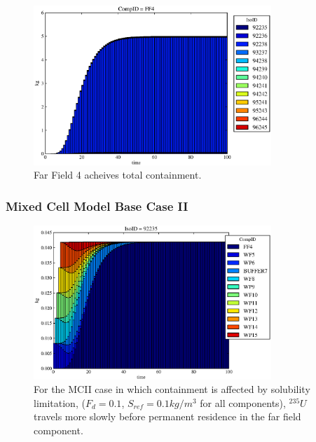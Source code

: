 \begin{frame}[ctb!]
\begin{figure}
\begin{minipage}[b]{0.45\linewidth}
  \includegraphics[width=0.8\textwidth]{./images/mcIII0.eps}
  \caption[Case MCI WP Contaminants.]{ 
    Far Field 4 acheives total containment.
    }
  \label{fig:mcII}


  \end{minipage}
\end{figure}

\end{frame}


\begin{frame}[ctb!]
  \frametitle{Mixed Cell Model Base Case II}
\begin{figure}[ht]
\centering
\includegraphics[width=0.8\textwidth]{./images/mcIII.eps}
\caption[$^{235}U$ residence. Mixed Cell Coupled Sorption and Solubility Limitation.]{
For the MCII case in which containment is affected by solubility limitation,
($F_{d}=0.1$, $S_{ref}=0.1kg/m^3$ for all components), $^{235}U$ travels more slowly
before permanent residence in the far field component.
}
\label{fig:mcIIIall}
\end{figure}
\end{frame}

